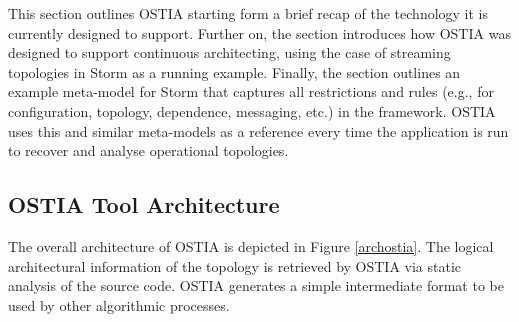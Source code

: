 

This section outlines OSTIA starting form a brief recap of the technology it is currently designed to support. Further on, the section introduces how OSTIA was designed to support continuous architecting, using the case of streaming topologies in Storm as a running example. Finally, the section outlines an example meta-model for Storm that captures all restrictions and rules (e.g., for configuration, topology, dependence, messaging, etc.) in the framework. OSTIA uses this and similar meta-models as a reference every time the application is run to recover and analyse operational topologies.

\subsection{OSTIA Tool Architecture}

The overall architecture of OSTIA is depicted in
Figure \ref{archostia}. The logical architectural information of the
topology is retrieved by OSTIA via static analysis of the source code. OSTIA
generates a simple intermediate format to be used by other algorithmic
processes.

